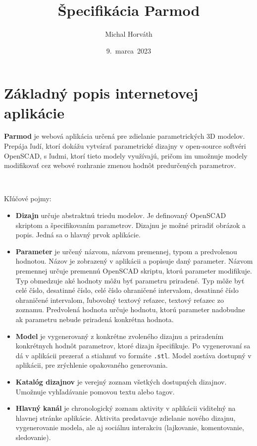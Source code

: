 \documentclass[a4paper]{article}
\title{Špecifikácia Parmod}
\author{Michal Horváth }
\date{9.\ marca\ 2023}
\begin{document}
\maketitle

\section{Základný popis internetovej aplikácie}
\textbf{Parmod} je webová aplikácia určená pre zdielanie parametrických 3D modelov.
Prepája ľudí, ktorí dokážu vytvárať parametrické dizajny 
v open-source softvéri OpenSCAD,
s ľudmi, ktorí tieto modely využívajú,
pričom im umožnuje modely modifikovať
cez webové rozhranie zmenou hodnôt predurčených parametrov.

\

Kľúčové pojmy:
\begin{itemize}

\item
\textbf{Dizajn} určuje abstraktnú triedu modelov. 
Je definovaný OpenSCAD skriptom a špecifikovaním parametrov.
Dizajnu je možné priradiť obrázok a popis.
Jedná sa o hlavný prvok aplikácie.

\item
\textbf{Parameter} je určený názvom, názvom premennej, typom a predvolenou hodnotou.
Názov je zobrazený v aplikácii a popisuje daný parameter.
Názvom premennej určuje premennú OpenSCAD skriptu, ktorú parameter modifikuje.
Typ obmedzuje aké hodnoty môžu byť parametru priradené.
Typ môže byť celé číslo, desatinné číslo, 
celé číslo ohraničené intervalom, desatinné číslo ohraničené intervalom, 
ľubovolný textový reťazec, textový reťazec zo zoznamu.
Predvolená hodnota určuje hodnotu, ktorú parameter nadobudne
ak parametru nebude priradená konkrétna hodnota.

\item
\textbf{Model} je vygenerovaný z konkrétne zvoleného dizajnu
a priradením konkrétnych hodnôt parametrov, ktoré dizajn špecifikuje.
Po vygenerovaní sa dá v aplikácii prezerať a stiahnuť vo formáte \texttt{.stl}.
Model zostáva dostupný v aplikácii, pre zrýchlenie opakovaného generovania.

\item
\textbf{Katalóg dizajnov} je verejný zoznam všetkých dostupných dizajnov.
Umožnuje vyhľadávanie pomovou textu alebo tagov.

\item
\textbf{Hlavný kanál} je chronologický zoznam aktivity v aplikácii
viditelný na hlavnej stránke aplikácie.
Aktivita predstavuje zdielanie nového dizajnu, vygenerovanie modela,
ale aj sociálnu interakciu (lajkovanie, komentovanie, sledovanie).

\end{itemize}
\end{document}
